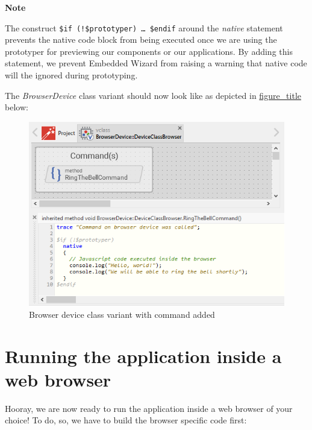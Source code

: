 \documentclass[
  a4paper,
,tablecaptionabove
]{scrbook}
\renewenvironment{quote}{\begin{customblockquote}\list{}{\rightmargin=0em\leftmargin=0em}%
\item\relax\color{blockquote-text}\ignorespaces}{\unskip\unskip\endlist\end{customblockquote}}
\begin{document}
\begin{quote}
\textbf{Note}

The construct \texttt{\$if\ (!\$prototyper)\ \ldots{}​\ \$endif} around
the \emph{native} statement prevents the native code block from being
executed once we are using the prototyper for previewing our components
or our applications. By adding this statement, we prevent Embedded
Wizard from raising a warning that native code will the ignored during
prototyping.
\end{quote}

The \emph{BrowserDevice} class variant should now look like as depicted
in \protect\hyperlink{fig:BrowserDeviceBellCommand}{figure\_title}
below:

\begin{figure}
\centering
\includegraphics{./../asciidoc/modules/ROOT/assets/images/deviceintegration/DeviceClassBrowserCommand.png}
\caption{Browser device class variant with command added}
\end{figure}

\hypertarget{_running_the_application_inside_a_web_browser}{%
\section{Running the application inside a web
browser}\label{_running_the_application_inside_a_web_browser}}

Hooray, we are now ready to run the application inside a web browser of
your choice! To do, so, we have to build the browser specific code
first:
\end{document}
